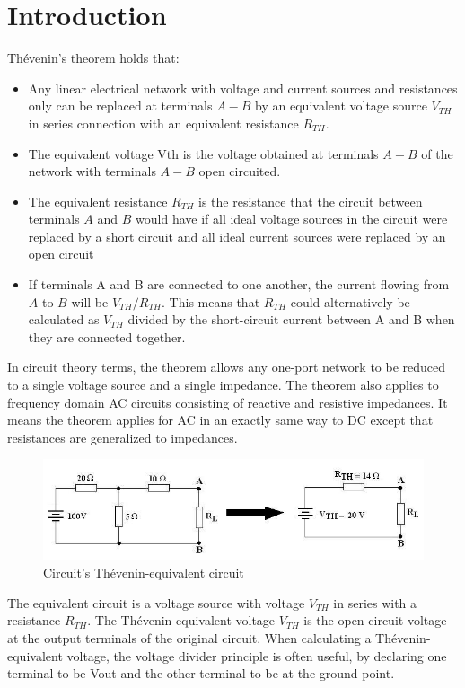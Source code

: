 \documentclass[letterpaper]{article}
\begin{document}
\section{Introduction}
Thévenin's theorem holds that:
\begin{itemize}
    \item {Any linear electrical network with voltage and current sources and resistances only
        can be replaced at terminals $A-B$ by an equivalent voltage source $V_{TH}$ in series connection
        with an equivalent resistance $R_{TH}$.}

    \item {The equivalent voltage Vth is the voltage obtained at terminals $A-B$ of the network
        with terminals $A-B$ open circuited.}
    \item {The equivalent resistance $R_{TH}$ is the resistance that the circuit between terminals $A$ and
        $B$ would have if all ideal voltage sources in the circuit were replaced by a short circuit and all ideal current sources were replaced by an open circuit}
    \item {If terminals A and B are connected to one another, the current flowing from $A$ to
        $B$
        will be $V_{TH}/R_{TH}$. This means that $R_{TH}$ could alternatively be
        calculated as $V_{TH}$ divided by
        the short-circuit current between A and B when they are connected together.}
\end{itemize}
In circuit theory terms, the theorem allows any one-port network to be reduced to a single voltage source and a single impedance.
The theorem also applies to frequency domain AC circuits consisting of reactive and resistive impedances. It means the theorem applies for AC in an exactly same way to DC except that resistances are generalized to impedances.
\begin{figure}[H]
    \centering
    \includegraphics[width=.85\linewidth]{thevenin}
    \caption{Circuit's Thévenin-equivalent circuit}
\end{figure}
        The equivalent circuit is a voltage source with voltage $V_{TH}$ in series with a
        resistance $R_{TH}$.
        The Thévenin-equivalent voltage $V_{TH}$ is the open-circuit voltage at the output terminals of the original circuit. When calculating a Thévenin-equivalent voltage, the voltage divider principle is often useful, by declaring one terminal to be Vout and the other terminal to be at the ground point.
\end{document}
